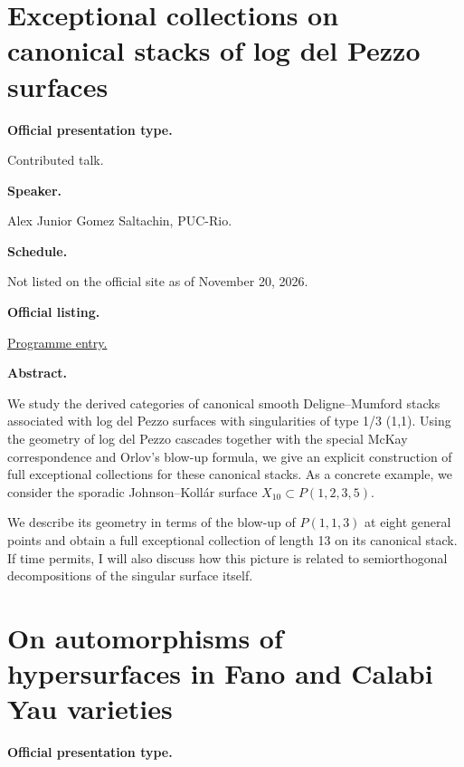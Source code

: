 \section{Exceptional collections on canonical
stacks of log del Pezzo surfaces}
\label{section-exceptional-collections-on}

\medskip\noindent
{\bf Official presentation type.}

Contributed talk.

\medskip\noindent
{\bf Speaker.}

Alex Junior Gomez Saltachin, PUC-Rio.

\medskip\noindent
{\bf Schedule.}

Not listed on the official site as of
November 20, 2026.

\medskip\noindent
{\bf Official listing.}

\href{%
https://sites.google.com/view/%
geoalgcompluff/legal/%
legal-2027-resumos#h.dant8g3oe5ea%
}{Programme entry.}

\medskip\noindent
{\bf Abstract.}

We study the derived categories of canonical
smooth Deligne–Mumford stacks associated with
log del Pezzo surfaces with singularities of
type 1/3 (1,1). Using the geometry of log del
Pezzo cascades together with the special
McKay correspondence and Orlov’s blow-up
formula, we give an explicit construction of
full exceptional collections for these
canonical stacks. As a concrete example, we
consider the sporadic Johnson–Kollár surface
$X_{10}\subset P(1,2,3,5)$.

We describe its geometry in terms of the
blow-up of $P(1,1,3)$ at eight general points
and obtain a full exceptional collection of
length 13 on its canonical stack. If time
permits, I will also discuss how this picture
is related to semiorthogonal decompositions
of the singular surface itself.

\section{On automorphisms of hypersurfaces in
Fano and Calabi Yau varieties}
\label{section-on-automorphisms-of}

\medskip\noindent
{\bf Official presentation type.}

